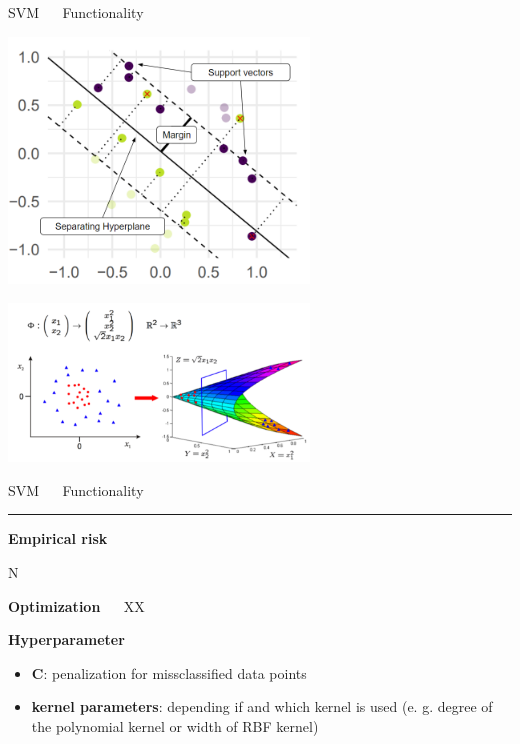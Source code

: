 \documentclass[11pt,compress,t,notes=noshow, xcolor=table]{beamer}
\begin{document}
\begin{frame}{\textcolor{gray!80}{SVM} ~~ Functionality}
\medskip
 \footnotesize
 \begin{minipage}{0.4\textwidth}
\centering
 \includegraphics[width=0.6\textwidth]{figure/svm_wording.png}
 \end{minipage}
  \normalsize
 \begin{minipage}{0.5\textwidth}
 \centering
 \includegraphics[width=0.6\textwidth]{figure/svm_kernel.PNG}
   
 \end{minipage}

\end{frame}


\LARGE
\begin{frame}{\textcolor{gray!80}{SVM} ~~ Functionality}
\normalsize
\vspace{-0.5cm}
\noindent \textcolor{gray!80}{\rule{\textwidth}{1pt}}

\vspace{0.3cm}

\footnotesize

\textbf{\textcolor{gray!80}{Empirical risk}}

N

\medskip

\textbf{\textcolor{gray!80}{Optimization}} ~~
XX

\medskip

\textbf{\textcolor{gray!80}{Hyperparameter}}

\begin{itemize}
  \item \textbf{C}: penalization for missclassified data points 
  \item \textbf{kernel parameters}: depending if and which kernel is used (e. g. degree of the polynomial kernel or width of RBF kernel)

\end{itemize}

\end{frame}
\end{document}
